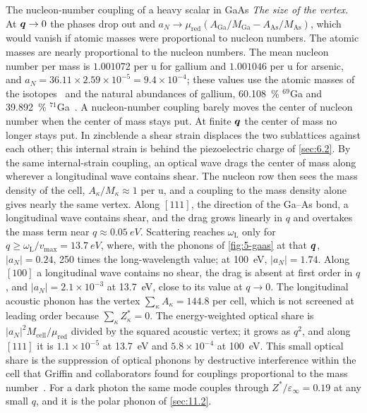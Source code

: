 \begin{workedexample}{The nucleon-number coupling of a heavy scalar in GaAs}
\emph{The size of the vertex.} At $\bm{q} \to 0$ the phases drop out and $a_N \to \mu_{\mathrm{red}}(A_{\mathrm{Ga}}/M_{\mathrm{Ga}} - A_{\mathrm{As}}/M_{\mathrm{As}})$, which would vanish if atomic masses were proportional to nucleon numbers. The atomic masses are nearly proportional to the nucleon numbers. The mean nucleon number per mass is $1.001072$ per u for gallium and $1.001046$ per u for arsenic, and $a_N = 36.11 \times 2.59\times10^{-5} = 9.4\times10^{-4}$; these values use the atomic masses of the isotopes~\cite{wang2021ame2020} and the natural abundances of gallium, \SI{60.108}{\percent} $^{69}$Ga and \SI{39.892}{\percent} $^{71}$Ga~\cite{meija2016isotopic}. A nucleon-number coupling barely moves the center of nucleon number when the center of mass stays put. At finite $\bm{q}$ the center of mass no longer stays put. In zincblende a shear strain displaces the two sublattices against each other; this internal strain is behind the piezoelectric charge of \cref{sec:6.2}. By the same internal-strain coupling, an optical wave drags the center of mass along wherever a longitudinal wave contains shear. The nucleon row then sees the mass density of the cell, $A_\kappa/M_\kappa \approx 1$ per u, and a coupling to the mass density alone gives nearly the same vertex. Along $[111]$, the direction of the Ga--As bond, a longitudinal wave contains shear, and the drag grows linearly in $q$ and overtakes the mass term near $q \approx \SI{0.05}{eV}$. Scattering reaches $\omega_{\mathrm{L}}$ only for $q \ge \omega_{\mathrm{L}}/v_{\mathrm{max}} = \SI{13.7}{eV}$, where, with the phonons of \cref{fig:5-gaas} at that $\bm{q}$, $|a_N| = 0.24$, 250 times the long-wavelength value; at \SI{100}{eV}, $|a_N| = 1.74$. Along $[100]$ a longitudinal wave contains no shear, the drag is absent at first order in $q$, and $|a_N| = 2.1\times10^{-3}$ at \SI{13.7}{eV}, close to its value at $q \to 0$. The longitudinal acoustic phonon has the vertex $\sum_\kappa A_\kappa = 144.8$ per cell, which is not screened at leading order because $\sum_\kappa Z^*_\kappa = 0$. The energy-weighted optical share is $|a_N|^2M_{\mathrm{cell}}/\mu_{\mathrm{red}}$ divided by the squared acoustic vertex; it grows as $q^2$, and along $[111]$ it is $1.1\times10^{-5}$ at \SI{13.7}{eV} and $5.8\times10^{-4}$ at \SI{100}{eV}. This small optical share is the suppression of optical phonons by destructive interference within the cell that Griffin and collaborators found for couplings proportional to the mass number~\cite[Eqs.~(30) and (33)]{griffin2018directional}. For a dark photon the same mode couples through $Z^*/\varepsilon_\infty = 0.19$ at any small $q$, and it is the polar phonon of \cref{sec:11.2}.
\end{workedexample}

